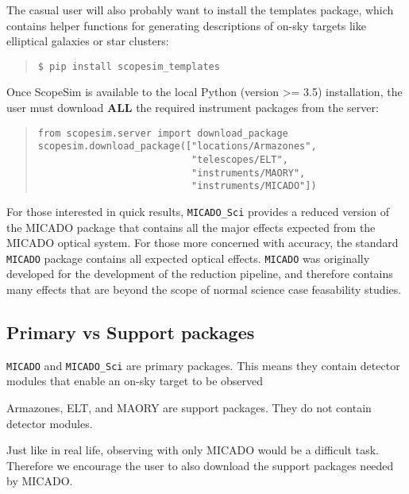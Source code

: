 The casual user will also probably want to install the templates package, which contains helper functions for generating descriptions of on-sky targets like elliptical galaxies or star clusters:

\begin{quote}
\begin{alltt}
\begin{lstlisting}[frame=single]
$ pip install scopesim_templates
\end{lstlisting}
\end{alltt}
\end{quote}

Once ScopeSim is available to the local Python (version >= 3.5) installation, the user must download \textbf{ALL} the required instrument packages from the server:

\begin{quote}
\begin{alltt}
\begin{lstlisting}[frame=single]
from scopesim.server import download_package
scopesim.download_package(["locations/Armazones",
                           "telescopes/ELT",
                           "instruments/MAORY",
                           "instruments/MICADO"])
\end{lstlisting}
\end{alltt}
\end{quote}


For those interested in quick results, \texttt{MICADO\_Sci} provides a reduced version of the MICADO package that contains all the major effects expected from the MICADO optical system.
For those more concerned with accuracy, the standard \texttt{MICADO} package contains all expected optical effects.
\texttt{MICADO} was originally developed for the development of the reduction pipeline, and therefore contains many effects that are beyond the scope of normal science case feasability studies.


\subsection{Primary vs Support packages%
  \label{primary-vs-support-packages}%
}

\texttt{MICADO} and \texttt{MICADO\_Sci} are primary packages.
This means they contain detector modules that enable an on-sky target to be observed

Armazones, ELT, and MAORY are support packages.
They do not contain detector modules.

Just like in real life, observing with only MICADO would be a difficult task.
Therefore we encourage the user to also download the support packages needed by MICADO.
